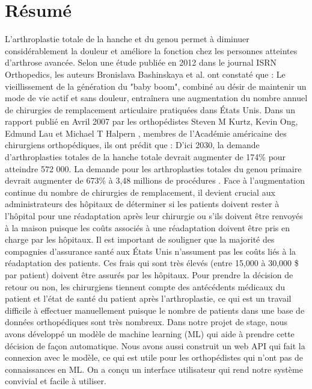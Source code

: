 \documentclass[12pt, french]{report}
\begin{document}
\chapter*{Résumé}
L'arthroplastie totale de la hanche et du genou permet à diminuer considérablement la douleur
et améliore la fonction chez les personnes atteintes d'arthrose avancée. Selon une étude publiée en 2012 dans le journal ISRN Orthopedics, les auteurs Bronislava Bashinskaya et al. \cite{key2} ont constaté que : \guillemotleft Le
vieillissement de la génération du "baby boom", combiné au désir de
maintenir un mode de vie actif et sans douleur, entraînera une augmentation
du nombre annuel de chirurgies de remplacement articulaire pratiquées dans
États Unis\guillemotright. Dans un rapport publié en Avril 2007 par les orthopédistes Steven M Kurtz, Kevin Ong, Edmund Lau et Michael T Halpern \cite{key3}, membres de l'Académie américaine des chirurgiens orthopédiques, ils ont prédit que : \guillemotleft  
D'ici 2030, la demande d'arthroplasties totales de la hanche totale devrait augmenter de 174\% pour atteindre 572 000. La demande pour les arthroplasties totales du genou primaire devrait augmenter de 673\% à 3,48 millions de procédures
 \guillemotright.
Face à l'augmentation continue du nombre de chirurgies de remplacement, il devient crucial aux administrateurs des hôpitaux de déterminer si les patients doivent rester à l'hôpital pour une réadaptation après leur 	chirurgie ou s'ils doivent être renvoyés à la maison puisque les coûts associés à une réadaptation doivent être pris en charge par les hôpitaux. Il est important de souligner que la majorité des compagnies d'assurance santé aux États Unis n'assument pas les coûts liés à la réadaptation des patients. Ces frais qui sont très élevés (entre 15,000 à 30,000 \$ par patient) doivent être assurés par les hôpitaux. Pour prendre la décision de retour ou non, les chirurgiens tiennent compte des antécédents médicaux du patient et l'état de santé du patient après l'arthroplastie, ce qui est un travail difficile à effectuer manuellement puisque le nombre de patients dans une base de données orthopédiques sont très nombreux. Dans notre projet de stage, nous avons développé un modèle de machine learning (ML) qui aide à prendre cette décision de façon automatique. Nous avons aussi construit un web API qui fait la connexion avec le modèle, ce qui est utile pour les orthopédistes qui n'ont pas de connaissances en ML. On a conçu un interface utilisateur qui rend notre système convivial et facile à utiliser. 
   	
\end{document}
